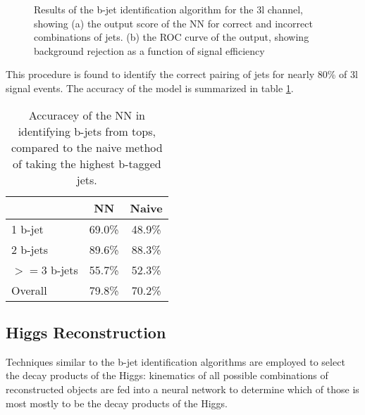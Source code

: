 \begin{figure}[h!]                                                                                                           
   \label{fig:top3lresults}                                                                                               
   \caption{Results of the b-jet identification algorithm for the 3l channel, showing (a) the output score of the NN for correct and incorrect combinations of jets. (b) the ROC curve of the output, showing background rejection as a function of signal efficiency}
\end{figure}

This procedure is found to identify the correct pairing of jets for nearly 80\% of 3l signal events. The accuracy of the model is summarized in table \ref{tab:topMatchAcc3l}.

\begin{table}[h!]
\centering
\caption{Accuracey of the NN in identifying b-jets from tops, compared to the naive method of taking the highest b-tagged jets.}
\begin{tabular}{l|c|c}
\hline\hline
& NN & Naive \\
\hline
1 b-jet    & 69.0\% & 48.9\% \\
2 b-jets   & 89.6\% & 88.3\% \\
$>=$3 b-jets & 55.7\% & 52.3\% \\
\hline
Overall & 79.8\% & 70.2\% \\
\hline\hline
\end{tabular}
\label{tab:topMatchAcc3l}
\end{table}


\subsection{Higgs Reconstruction}
\label{sec:higgsID}

Techniques similar to the b-jet identification algorithms are employed to select the decay products of the Higgs: kinematics of all possible combinations of reconstructed objects are fed into a neural network to determine which of those is most mostly to be the decay products of the Higgs.

